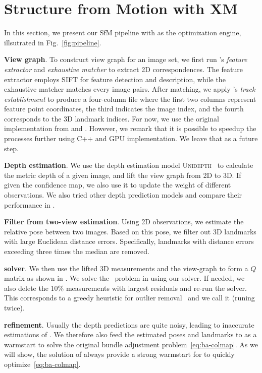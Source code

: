 

\vspace{-3mm}
\section{Structure from Motion with XM}
\label{sec:xm-sfm}

In this section, we present our SfM pipeline with \nameshort as the optimization engine, illsutrated in Fig.~\ref{fig:pipeline}. 


{\bf View graph}.
To construct view graph for an image set, we first run \colmap's \textit{feature extractor} and \textit{exhaustive matcher} to extract 2D correspondences. The {feature extractor} employs SIFT \cite{lowe1999sift} for feature detection and description, while the {exhaustive matcher} matches every image pairs. After matching, we apply \glomap's \textit{track establishment} to produce a four-column file where the first two columns represent feature point coordinates, the third indicates the image index, and the fourth corresponds to the 3D landmark indices. For now, we use the original implementation from \colmap and \glomap. However, we remark that it is possible to speedup the processes further using C++ and GPU implementation. We leave that as a future step.



{\bf Depth estimation}.
We use the depth estimation model \textsc{Unidepth}~\cite{piccinelli2024unidepth} to calculate the metric depth of a given image, and lift the view graph from 2D to 3D. If given the confidence map, we also use it to update the weight of different observations. We also tried other depth prediction models and compare their performance in .

{\bf Filter from two-view estimation}.
Using 2D observations, we estimate the relative pose between two images. Based on this pose, we filter out 3D landmarks with large Euclidean distance errors. Specifically, landmarks with distance errors exceeding three times the median are removed.

{\bf \nameshort solver}.
We then use the lifted 3D measurements and the view-graph to form a $Q$ matrix as shown in . We solve the \sdp~problem in  using our \nameshort solver. If needed, we also delete the 10\% measurements with largest residuals and re-run the \nameshort solver. This corresponds to a greedy heuristic for outlier removal~\cite{antonante2021outlier} and we call it \xmdouble (runing twice).

{\bf \ceres refinement}.
Usually the depth predictions are quite noisy, leading to inaccurate estimations of \nameshort. We therefore also feed the estimated poses and landmarks to \ceres as a warmstart to solve the original bundle adjustment problem~\eqref{eq:ba-colmap}. As we will show, the solution of \nameshort always provide a strong warmstart for \ceres to quickly optimize~\eqref{eq:ba-colmap}.

